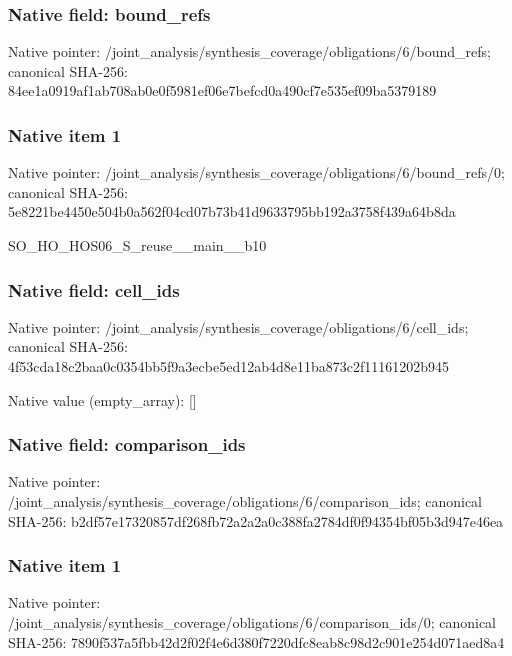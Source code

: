 \documentclass[10pt,a4paper]{article}
\begin{document}
\subsubsection{Native field: bound\_\allowbreak{}refs}
Native pointer: /joint\_\allowbreak{}analysis/synthesis\_\allowbreak{}coverage/obligations/6/bound\_\allowbreak{}refs; canonical SHA-256: 84ee1a0919af1ab708ab0e0f5981ef06e7befcd0a490cf7e535ef09ba5379189

\subsubsection{Native item 1}
Native pointer: /joint\_\allowbreak{}analysis/synthesis\_\allowbreak{}coverage/obligations/6/bound\_\allowbreak{}refs/0; canonical SHA-256: 5e8221be4450e504b0a562f04cd07b73b41d9633795bb192a3758f439a64b8da

\begingroup\raggedright\sloppy SO\_\allowbreak{}HO\_\allowbreak{}HOS06\_\allowbreak{}S\_\allowbreak{}reuse\_\allowbreak{}\_\allowbreak{}main\_\allowbreak{}\_\allowbreak{}b10\par\endgroup

\subsubsection{Native field: cell\_\allowbreak{}ids}
Native pointer: /joint\_\allowbreak{}analysis/synthesis\_\allowbreak{}coverage/obligations/6/cell\_\allowbreak{}ids; canonical SHA-256: 4f53cda18c2baa0c0354bb5f9a3ecbe5ed12ab4d8e11ba873c2f11161202b945

Native value (empty\_\allowbreak{}array): []

\subsubsection{Native field: comparison\_\allowbreak{}ids}
Native pointer: /joint\_\allowbreak{}analysis/synthesis\_\allowbreak{}coverage/obligations/6/comparison\_\allowbreak{}ids; canonical SHA-256: b2df57e17320857df268fb72a2a2a0c388fa2784df0f94354bf05b3d947e46ea

\subsubsection{Native item 1}
Native pointer: /joint\_\allowbreak{}analysis/synthesis\_\allowbreak{}coverage/obligations/6/comparison\_\allowbreak{}ids/0; canonical SHA-256: 7890f537a5fbb42d2f02f4e6d380f7220dfc8eab8c98d2c901e254d071aed8a4
\end{document}
